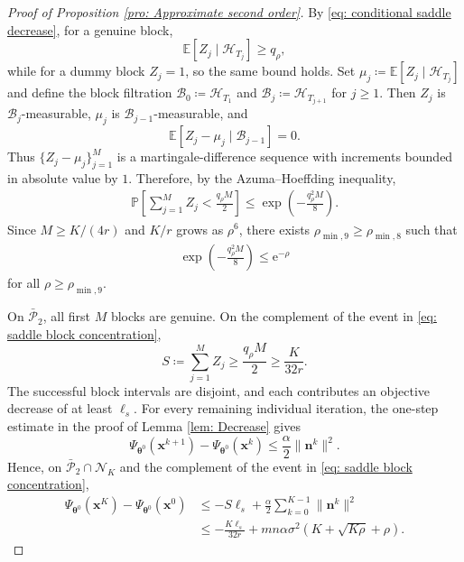 \documentclass{siamart251216}
\begin{document}
\begin{proof}[Proof of Proposition \ref{pro: Approximate second order}]
    By \eqref{eq: conditional saddle decrease}, for a genuine block,
    \[
        \mathbb{E}[Z_j\mid\mathcal{H}_{T_j}]\geq q_{\rho},
    \]
    while for a dummy block $Z_j=1$, so the same bound holds. Set $\mu_j\coloneqq\mathbb{E}[Z_j\mid\mathcal{H}_{T_j}]$ and define the block filtration $\mathcal{B}_{0}\coloneqq\mathcal{H}_{T_1}$ and $\mathcal{B}_{j}\coloneqq\mathcal{H}_{T_{j+1}}$ for $j\geq1$. Then $Z_j$ is $\mathcal{B}_{j}$-measurable, $\mu_j$ is $\mathcal{B}_{j-1}$-measurable, and
    \[
        \mathbb{E}[Z_j-\mu_j\mid\mathcal{B}_{j-1}]=0.
    \]
    Thus $\{Z_j-\mu_j\}_{j=1}^{M}$ is a martingale-difference sequence with increments bounded in absolute value by $1$. Therefore, by the Azuma--Hoeffding inequality,
    \begin{gather}
        \label{eq: saddle block concentration}
        \mathbb{P}\left[\sum_{j=1}^{M}Z_j<\frac{q_{\rho}M}{2}\right]
        \leq
        \exp\left(-\frac{q_{\rho}^{2}M}{8}\right).
    \end{gather}
    Since $M\geq K/(4r)$ and $K/r$ grows as $\rho^{6}$, there exists $\rho_{\min,9}\geq\rho_{\min,8}$ such that
    \begin{gather}
        \label{eq: saddle block tail}
        \exp\left(-\frac{q_{\rho}^{2}M}{8}\right)\leq\mathrm{e}^{-\rho}
    \end{gather}
    for all $\rho\geq\rho_{\min,9}$.

    On $\bar{\mathcal{P}}_{2}$, all first $M$ blocks are genuine. On the complement of the event in \eqref{eq: saddle block concentration},
    \[
        S\coloneqq\sum_{j=1}^{M}Z_j
        \geq\frac{q_{\rho}M}{2}
        \geq\frac{K}{32r}.
    \]
    The successful block intervals are disjoint, and each contributes an objective decrease of at least $\ell_s$. For every remaining individual iteration, the one-step estimate in the proof of Lemma \ref{lem: Decrease} gives
    \[
        \Psi_{\boldsymbol{\theta}^{0}}(\mathbf{x}^{k+1})
        -\Psi_{\boldsymbol{\theta}^{0}}(\mathbf{x}^{k})
        \leq\frac{\alpha}{2}\|\mathbf{n}^{k}\|^{2}.
    \]
    Hence, on $\bar{\mathcal{P}}_{2}\cap\mathcal{N}_{K}$ and the complement of the event in \eqref{eq: saddle block concentration},
    \begin{align}
        \label{eq: P2 total decrease}
        \Psi_{\boldsymbol{\theta}^{0}}(\mathbf{x}^{K})
        -\Psi_{\boldsymbol{\theta}^{0}}(\mathbf{x}^{0})
        &\leq
        -S\ell_s+\frac{\alpha}{2}\sum_{k=0}^{K-1}\|\mathbf{n}^{k}\|^{2}\nonumber\\
        &\leq
        -\frac{K\ell_s}{32r}
        +mn\alpha\sigma^{2}(K+\sqrt{K\rho}+\rho).
    \end{align}


\end{proof}
\end{document}
